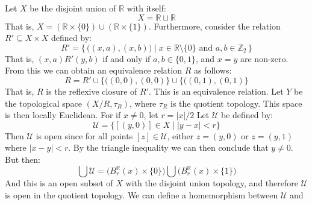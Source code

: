 \documentclass{article}                                                        %
\begin{document}
        \begin{example}
                Let $X$ be the disjoint union of $\mathbb{R}$ with itself:
                \begin{equation}
                    X=\mathbb{R}\sqcup\mathbb{R}
                \end{equation}
                That is, $X=(\mathbb{R}\times\{0\})\cup(\mathbb{R}\times\{1\})$.
                Furthermore, consider the relation $R'\subseteq{X}\times{X}$
                defined by:
                \begin{equation}
                    R'=\Big\{\,\Big((x,a),(x,b)\Big)\;\Big|\;
                        x\in\mathbb{R}\setminus\{0\}
                        \textrm{ and }a,b\in\mathbb{Z}_{2}\,\Big\}
                \end{equation}
                That is, $(x,a)R'(y,b)$ if and only if $a,b\in\{0,1\}$, and
                $x=y$ are non-zero. From this we can obtain an equivalence
                relation $R$ as follows:
                \begin{equation}
                    R=R'\cup\big\{\big((0,0),(0,0)\big\}\cup
                        \big\{\big((0,1),(0,1)\big\}
                \end{equation}
                That is, $R$ is the reflexive closure of $R'$. This is an
                equivalence relation. Let $Y$ be the topological space
                $(X/R,\tau_{R})$, where $\tau_{R}$ is the quotient topology.
                This space is then locally Euclidean. For if $x\ne{0}$, let
                $r=|x|/2$ Let $\mathcal{U}$ be defined by:
                \begin{equation}
                    \mathcal{U}=\big\{[(y,0)]\in{X}\;|\;|y-x|<r\big\}
                \end{equation}
                Then $\mathcal{U}$ is open since for all points
                $[z]\in\mathcal{U}$, either $z=(y,0)$ or $z=(y,1)$ where
                $|x-y|<r$. By the triangle inequality we can then conclude that
                $y\ne{0}$. But then:
                \begin{equation}
                    \bigcup\mathcal{U}=\Big(B_{r}^{\mathbb{R}}(x)\times\{0\}\Big)
                        \bigcup\Big(B_{r}^{\mathbb{R}}(x)\times\{1\}\Big)
                \end{equation}
                And this is an open subset of $X$ with the disjoint union
                topology, and therefore $\mathcal{U}$ is open in the quotient
                topology. We can define a homemorphism between $\mathcal{U}$ and

\end{example}
\end{document}
